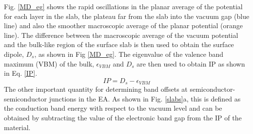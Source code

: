 \documentclass[11pt, twoside]{report}
\begin{document}
Fig. \ref{MD_eg} shows the rapid oscillations in the planar average of the potential for each layer in the slab, the plateau far from the slab into the vacuum gap (blue line) and also the smoother macroscopic average of the planar potential (orange line).
The difference between the macroscopic average of the vacuum potential and the bulk-like region of the surface slab is then used to obtain the surface dipole, $D_s$, as shown in Fig \ref{MD_eg}.  The eigenvalue of the valence band maximum (VBM) of the bulk, $\epsilon_{VBM}$ and $D_s$ are then used to obtain IP as shown in Eq. \ref{IP}.
\begin{equation}\label{IP}
IP = D_s - \epsilon_{VBM}
\end{equation}
The other important quantity for determining band offsets at semiconductor-semiconductor junctions in the EA. As shown in Fig. \ref{slabs}a, this is defined as the conduction band energy with respect to the vacuum level and can be obtained by subtracting the value of the electronic band gap from the IP of the material. 
\end{document}
